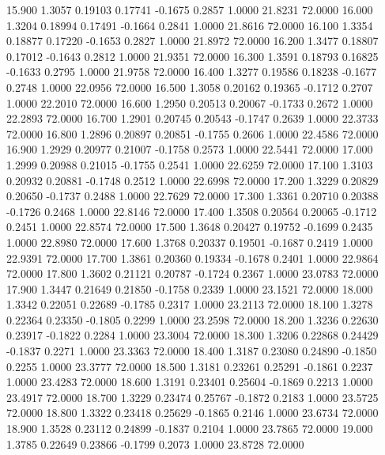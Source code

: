   15.900   1.3057   0.19103   0.17741  -0.1675   0.2857   1.0000  21.8231  72.0000
  16.000   1.3204   0.18994   0.17491  -0.1664   0.2841   1.0000  21.8616  72.0000
  16.100   1.3354   0.18877   0.17220  -0.1653   0.2827   1.0000  21.8972  72.0000
  16.200   1.3477   0.18807   0.17012  -0.1643   0.2812   1.0000  21.9351  72.0000
  16.300   1.3591   0.18793   0.16825  -0.1633   0.2795   1.0000  21.9758  72.0000
  16.400   1.3277   0.19586   0.18238  -0.1677   0.2748   1.0000  22.0956  72.0000
  16.500   1.3058   0.20162   0.19365  -0.1712   0.2707   1.0000  22.2010  72.0000
  16.600   1.2950   0.20513   0.20067  -0.1733   0.2672   1.0000  22.2893  72.0000
  16.700   1.2901   0.20745   0.20543  -0.1747   0.2639   1.0000  22.3733  72.0000
  16.800   1.2896   0.20897   0.20851  -0.1755   0.2606   1.0000  22.4586  72.0000
  16.900   1.2929   0.20977   0.21007  -0.1758   0.2573   1.0000  22.5441  72.0000
  17.000   1.2999   0.20988   0.21015  -0.1755   0.2541   1.0000  22.6259  72.0000
  17.100   1.3103   0.20932   0.20881  -0.1748   0.2512   1.0000  22.6998  72.0000
  17.200   1.3229   0.20829   0.20650  -0.1737   0.2488   1.0000  22.7629  72.0000
  17.300   1.3361   0.20710   0.20388  -0.1726   0.2468   1.0000  22.8146  72.0000
  17.400   1.3508   0.20564   0.20065  -0.1712   0.2451   1.0000  22.8574  72.0000
  17.500   1.3648   0.20427   0.19752  -0.1699   0.2435   1.0000  22.8980  72.0000
  17.600   1.3768   0.20337   0.19501  -0.1687   0.2419   1.0000  22.9391  72.0000
  17.700   1.3861   0.20360   0.19334  -0.1678   0.2401   1.0000  22.9864  72.0000
  17.800   1.3602   0.21121   0.20787  -0.1724   0.2367   1.0000  23.0783  72.0000
  17.900   1.3447   0.21649   0.21850  -0.1758   0.2339   1.0000  23.1521  72.0000
  18.000   1.3342   0.22051   0.22689  -0.1785   0.2317   1.0000  23.2113  72.0000
  18.100   1.3278   0.22364   0.23350  -0.1805   0.2299   1.0000  23.2598  72.0000
  18.200   1.3236   0.22630   0.23917  -0.1822   0.2284   1.0000  23.3004  72.0000
  18.300   1.3206   0.22868   0.24429  -0.1837   0.2271   1.0000  23.3363  72.0000
  18.400   1.3187   0.23080   0.24890  -0.1850   0.2255   1.0000  23.3777  72.0000
  18.500   1.3181   0.23261   0.25291  -0.1861   0.2237   1.0000  23.4283  72.0000
  18.600   1.3191   0.23401   0.25604  -0.1869   0.2213   1.0000  23.4917  72.0000
  18.700   1.3229   0.23474   0.25767  -0.1872   0.2183   1.0000  23.5725  72.0000
  18.800   1.3322   0.23418   0.25629  -0.1865   0.2146   1.0000  23.6734  72.0000
  18.900   1.3528   0.23112   0.24899  -0.1837   0.2104   1.0000  23.7865  72.0000
  19.000   1.3785   0.22649   0.23866  -0.1799   0.2073   1.0000  23.8728  72.0000
